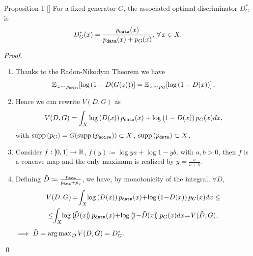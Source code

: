 \documentclass{beamer}
\begin{document}
	\begin{frame}
		\begin{block}{Proposition 1 \hfill [\citeauthor{goodfellow2014}]}
			For a fixed generator $G$, the associated optimal discriminator $D^*_G$ is
			\vspace{-0.3cm}
			\begin{equation*}
				D^*_G(x) = \frac{p_{\text{\texttt{data}}}(x)}{p_{\text{\texttt{data}}}(x) + p_G(x)}, \, \forall x \in X.
			\end{equation*}		
		\end{block}
		\textit{Proof.} 
		\begin{enumerate}
			\item 
				Thanks to the Radon-Nikodym Theorem we have 
				\vspace{-0.2cm}
				\begin{equation*}
					\mean[z \sim p_\text{\texttt{noise}}]{\log{1 - D(G(z))}} = \mean[x \sim p_G]{\log{1 - D(x)}}.
				\end{equation*}
			\item 
				Hence we can rewrite $V(D, G)$ as
				\vspace{-0.3cm}
				\begin{equation*}
					V(D, G) = \int_X \log{D(x)} p_\text{\texttt{data}}(x) + \log{1 - D(x)} p_G(x) dx, 
				\end{equation*}
				\vskip -0.3cm
				with $\supp{p_G} = G(\supp{p_\text{\texttt{noise}}}) \subset X$, $\supp{p_\text{\texttt{data}}} \subset X$.
		\end{enumerate}
	\end{frame}

	\begin{frame}
		\begin{enumerate}\setcounter{enumi}{2}
			\item 
				Consider $f: [0, 1] \to \real$, $f(y) \coloneqq \log{y} a + \log{1 - y} b$, with $a, b > 0$, then $f$ is a concave map and the only maximum is realized by $y = \frac{a}{a + b}$.
			\item 
				Defining $\tilde{D} \coloneqq \frac{p_\text{\texttt{data}}}{p_\text{\texttt{data}} + p_g}$, we have, by monotonicity of the integral, $\forall D$,
				\vspace{-0.2cm}
				\begin{align*}
					& V(D, G) \kern-1pt = \kern-2pt \int_X \kern-2pt \log{D(x)} p_\text{\texttt{data}}(x) \kern-2pt + \kern-2pt \log{1 \kern-2pt - \kern-2pt D(x)} p_G(x) dx \leq \\
					& \leq \kern-3pt \int_X \kern-2pt \log{\kern-2pt \tilde{D}(x) \kern-2pt} p_\text{\texttt{data}}(x) \kern-2pt + \kern-2pt \log{\kern-2pt 1 \kern-2pt - \kern-2pt \tilde{D}(x) \kern-2pt} p_G(x) dx \kern-2pt = \kern-2pt V(\tilde{D}, G),
				\end{align*}
				$\implies \tilde{D} = \argmax_{D} V(D, G) = D^*_G$.
		\end{enumerate}
		\qed
	\end{frame}
\end{document}
